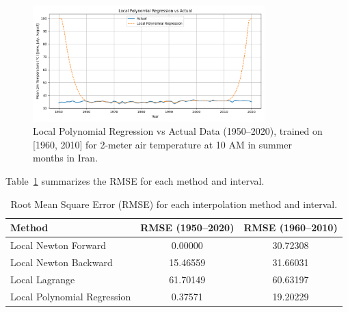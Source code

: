 \begin{figure}[htbp]
    \centering
    \includegraphics[width=0.8\textwidth]{../figs/Local_Polynomial_Regression_vs_actual[1960, 2010, 1].png}
    \caption{Local Polynomial Regression vs Actual Data (1950--2020), trained on [1960, 2010] for 2-meter air temperature at 10 AM in summer months in Iran.}
    \label{fig:regression2}
\end{figure}

Table~\ref{tab:rmse} summarizes the RMSE for each method and interval.

\begin{table}[htbp]
    \centering
    \begin{tabular}{lcc}
        \hline
        Method & RMSE (1950--2020) & RMSE (1960--2010) \\
        \hline
        Local Newton Forward & 0.00000 & 30.72308 \\
        Local Newton Backward & 15.46559 & 31.66031 \\
        Local Lagrange & 61.70149 & 60.63197 \\
        Local Polynomial Regression & 0.37571 & 19.20229 \\
        \hline
    \end{tabular}
    \caption{Root Mean Square Error (RMSE) for each interpolation method and interval.}
    \label{tab:rmse}
\end{table}
